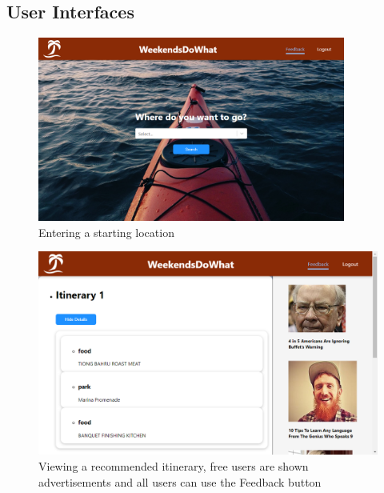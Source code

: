 \documentclass[12pt,a4paper]{article}
\begin{document}
\begin{appendix}

\section{User Interfaces}
\label{appendix_ui}

\begin{figure}[H]
	\centering
	\includegraphics[width=0.9\textwidth]{figures/ui-search.png}
	\caption{Entering a starting location}
\end{figure}

\begin{figure}[H]
	\centering
	\includegraphics[width=1\textwidth]{figures/ui-itineraries-expand.png}
	\caption{Viewing a recommended itinerary, free users are shown advertisements and all users can use the Feedback button}
\end{figure}


\end{appendix}
\end{document}

